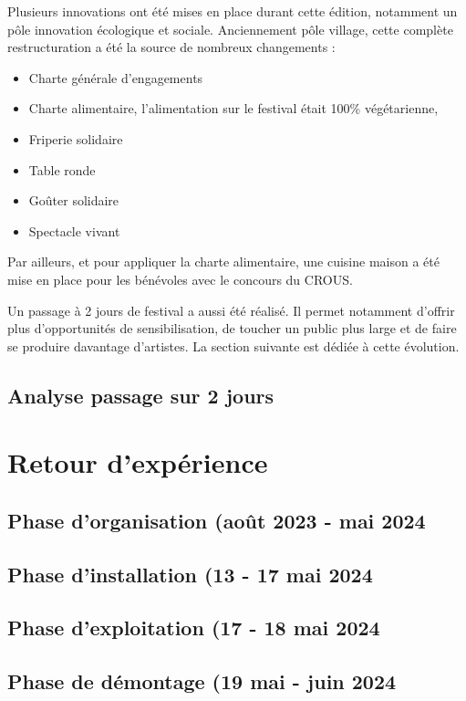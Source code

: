 \documentclass[12pt,a4paper]{report}
\begin{document}
Plusieurs innovations ont été mises en place  durant cette édition, notamment un pôle innovation écologique et sociale. Anciennement pôle village, cette complète restructuration a été la source de nombreux changements : 
\begin{itemize}
\item Charte générale d’engagements
\item Charte alimentaire, l'alimentation sur le festival était 100\% végétarienne,
\item Friperie solidaire
\item Table ronde
\item Goûter solidaire
\item Spectacle vivant
\end{itemize}

Par ailleurs, et pour appliquer la charte alimentaire, une cuisine maison a été mise en place pour les bénévoles avec le concours du CROUS.

Un passage à 2 jours de festival a aussi été réalisé. Il permet notamment d'offrir plus d'opportunités de sensibilisation, de toucher un public plus large et de faire se produire davantage d'artistes. La section suivante est dédiée à cette évolution.



\section{Analyse passage sur 2 jours}

\chapter{Retour d'expérience}

\section{Phase d'organisation (août 2023 - mai 2024}

\section{Phase d'installation (13 - 17 mai 2024}

\section{Phase d'exploitation (17 - 18 mai 2024}

\section{Phase de démontage (19 mai - juin 2024}
\end{document}
